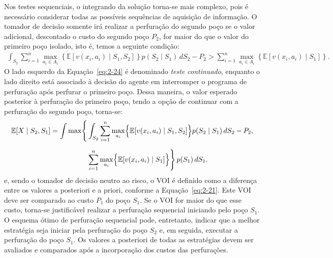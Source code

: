 Nos testes sequenciais, o integrando da solução torna-se mais complexo, pois é necessário considerar todas as possíveis sequências de aquisição de informação. O tomador de decisão somente irá realizar a perfuração do segundo poço se o valor adicional, descontado o custo do segundo poço $P_2$, for maior do que o valor do primeiro poço isolado, isto é, temos a seguinte condição:
\begin{equation}
\begin{aligned}
    \int_{S_2} \sum_{i=1}^{n} \max_{a_i \in A_i} 
    \left\{ \mathbb{E}\!\left[ v(x_i,a_i) \mid S_1,S_2 \right] \right\}
    p(S_2 \mid S_1)\, dS_2 - P_2 
    > \sum_{i=1}^{n} \max_{a_i \in A_i} 
    \left\{ \mathbb{E}\!\left[ v(x_i,a_i) \mid S_1 \right] \right\}.
\end{aligned}
\label{eq:2-24}
\end{equation}
O lado esquerdo da Equação~\eqref{eq:2-24} é denominado \textit{teste continuado}, enquanto o lado direito está associado à decisão do agente em interromper o programa de perfuração após perfurar o primeiro poço. Dessa maneira, o valor esperado posterior à perfuração do primeiro poço, tendo a opção de continuar com a perfuração do segundo poço, torna-se:
\begin{equation}
\begin{aligned}
\mathbb{E}[X\mid S_2,S_1] 
= \int \max \Biggl\{ &
    \int_{S_2} \sum_{i=1}^{n} \max_{a_i} 
    \Bigl\{ \mathbb{E}[v(x_i,a_i)\mid S_1,S_2] \Bigr\}
    p(S_2 \mid S_1)\, dS_2 - P_2, \\[6pt]
& \sum_{i=1}^{n} \max_{a_i} 
    \Bigl\{ \mathbb{E}[v(x_i,a_i)\mid S_1] \Bigr\}
\Biggr\} \, p(S_1)\, dS_1.
\end{aligned}
\label{eq:2-25}
\end{equation}
e, sendo o tomador de decisão neutro ao risco, o VOI é definido como a diferença entre os valores a posteriori e a priori, conforme a Equação~\eqref{eq:2-21}. Este VOI deve ser comparado ao custo $P_1$ do poço $S_1$. Se o VOI for maior do que esse custo, torna-se justificável realizar a perfuração sequencial iniciando pelo poço $S_1$. O esquema ótimo de perfuração sequencial pode, entretanto, indicar que a melhor estratégia seja iniciar pela perfuração do poço $S_2$ e, em seguida, executar a perfuração do poço $S_1$. Os valores a posteriori de todas as estratégias devem ser avaliados e comparados após a incorporação dos custos das perfurações.

